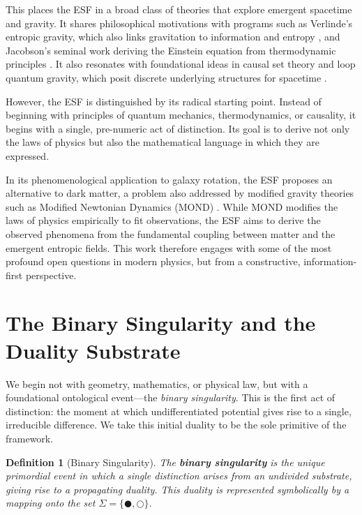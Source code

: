 \documentclass[12pt, a4paper]{article}
\newtheorem{definition}{Definition}[section]
\begin{document}
This places the ESF in a broad class of theories that explore emergent spacetime and gravity. It shares philosophical motivations with programs such as Verlinde's entropic gravity, which also links gravitation to information and entropy \cite{Verlinde2011}, and Jacobson's seminal work deriving the Einstein equation from thermodynamic principles \cite{Jacobson1995}. It also resonates with foundational ideas in causal set theory and loop quantum gravity, which posit discrete underlying structures for spacetime \cite{Sorkin2005, Rovelli2004}.

However, the ESF is distinguished by its radical starting point. Instead of beginning with principles of quantum mechanics, thermodynamics, or causality, it begins with a single, pre-numeric act of distinction. Its goal is to derive not only the laws of physics but also the mathematical language in which they are expressed.

In its phenomenological application to galaxy rotation, the ESF proposes an alternative to dark matter, a problem also addressed by modified gravity theories such as Modified Newtonian Dynamics (MOND) \cite{Milgrom1983}. While MOND modifies the laws of physics empirically to fit observations, the ESF aims to derive the observed phenomena from the fundamental coupling between matter and the emergent entropic fields. This work therefore engages with some of the most profound open questions in modern physics, but from a constructive, information-first perspective.

\section{The Binary Singularity and the Duality Substrate}
\label{sec:binary_singularity}

We begin not with geometry, mathematics, or physical law, but with a foundational ontological event—the \emph{binary singularity}. This is the first act of distinction: the moment at which undifferentiated potential gives rise to a single, irreducible difference. We take this initial duality to be the sole primitive of the framework.

\begin{definition}[Binary Singularity]
The \textbf{binary singularity} is the unique primordial event in which a single distinction arises from an undivided substrate, giving rise to a propagating duality. This duality is represented symbolically by a mapping onto the set $\Sigma = \{ \CIRCLE, \Circle \}$.
\end{definition}
\end{document}
